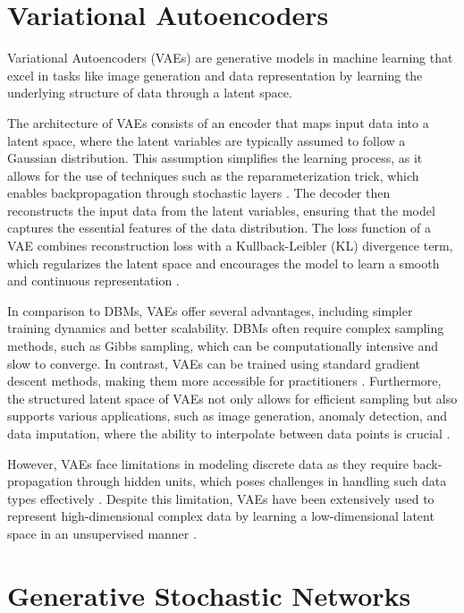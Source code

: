 \section*{Variational Autoencoders}
Variational Autoencoders (VAEs) are generative models in machine learning that excel in tasks like image generation and data 
representation by learning the underlying structure of data through a latent space. 

The architecture of VAEs consists of an encoder that maps input data into a latent space, where the latent variables are 
typically assumed to follow a Gaussian distribution. This assumption simplifies the learning process, as it allows for 
the use of techniques such as the reparameterization trick, which enables backpropagation through stochastic layers \citep{10.1561/2200000056}. 
The decoder then reconstructs the input data from the latent variables, ensuring that the model captures the essential 
features of the data distribution. The loss function of a VAE combines reconstruction loss with a Kullback-Leibler (KL) 
divergence term, which regularizes the latent space and encourages the model to learn a smooth and continuous representation \citep{10.3390/jimaging4020036}.

In comparison to DBMs, VAEs offer several advantages, including simpler training dynamics and better scalability. DBMs 
often require complex sampling methods, such as Gibbs sampling, which can be computationally intensive and slow to converge. 
In contrast, VAEs can be trained using standard gradient descent methods, making them more accessible for 
practitioners \citep{10.1561/2200000056}\citep{10.1109/access.2020.2977671}. Furthermore, the structured latent space of 
VAEs not only allows for efficient sampling but also supports various applications, such as image generation, anomaly detection, 
and data imputation, where the ability to interpolate between data points is crucial \citep{10.1088/2632-2153/ab80b7}\citep{10.48550/arxiv.2002.10464}.

However, VAEs face limitations in modeling discrete data as they require back-propagation through hidden units, which poses challenges 
in handling such data types effectively \citep{10.48550/arxiv.1909.13062}. Despite this limitation, VAEs have been extensively used to 
represent high-dimensional complex data by learning a low-dimensional latent space in an unsupervised manner \citep{10.48550/arxiv.2106.06500}.


\section*{Generative Stochastic Networks}


